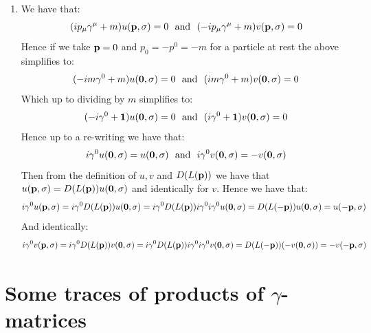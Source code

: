 \documentclass[10pt,a4paper]{article}
\begin{document}
\begin{enumerate}
\item We have that:
\[
(i p_\mu \gamma^\mu + m) u(\vb{p}, \sigma) = 0 \mbox{~~and~~} (-i p_\mu \gamma^\mu + m) v(\vb{p}, \sigma) = 0
\]
Hence if we take $\vb{p} = 0$ and $p_0 = -p^0 = -m$ for a particle at rest the above simplifies to:
\[
(-im \gamma^0 + m) u(\vb{0}, \sigma) = 0 \mbox{~~and~~} (i m \gamma^0 + m) v(\vb{0}, \sigma) = 0
\]
Which up to dividing by $m$ simplifies to:
\[
(-i \gamma^0 + \vb{1}) u(\vb{0}, \sigma) = 0 \mbox{~~and~~} (i\gamma^0 + \vb{1}) v(\vb{0}, \sigma) = 0
\]
Hence up to a re-writing we have that:
\[
i\gamma^0 u(\vb{0}, \sigma) = u(\vb{0}, \sigma) \mbox{~~and~~} i\gamma^0 v(\vb{0}, \sigma) = - v(\vb{0}, \sigma)
\]
Then from the definition of $u, v$ and $D(L(\vb{p}))$ we have that $u(\vb{p}, \sigma) = D(L(\vb{p})) u(\vb{0}, \sigma)$ and identically for $v$. Hence we have that:
\[
i \gamma^0 u(\vb{p}, \sigma) = i \gamma^0 D(L(\vb{p})) u(\vb{0}, \sigma) = i \gamma^0 D(L(\vb{p})) i \gamma^0 i \gamma^0 u(\vb{0}, \sigma) = D(L(-\vb{p})) u(\vb{0}, \sigma) = u(-\vb{p}, \sigma)
\]
And identically:
\[
i\gamma^0 v(\vb{p}, \sigma) = i\gamma^0 D(L(\vb{p})) v(\vb{0}, \sigma) = i \gamma^0 D(L(\vb{p})) i \gamma^0 i \gamma^0 v(\vb{0}, \sigma) = D(L(-\vb{p})) (-v(\vb{0}, \sigma)) = - v(-\vb{p}, \sigma) 
\]

\end{enumerate}


\section{Some traces of products of $\gamma$-matrices}
\end{document}

